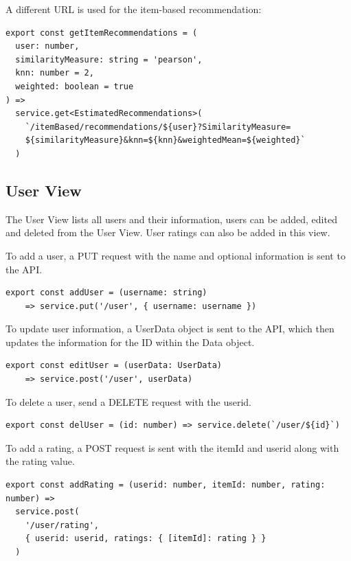 A different URL is used for the item-based recommendation:

\begin{verbatim}
export const getItemRecommendations = (
  user: number,
  similarityMeasure: string = 'pearson',
  knn: number = 2,
  weighted: boolean = true
) =>
  service.get<EstimatedRecommendations>(
    `/itemBased/recommendations/${user}?SimilarityMeasure=
    ${similarityMeasure}&knn=${knn}&weightedMean=${weighted}`
  )
\end{verbatim}

\subsection{User View}

The User View lists all users and their information, users can be added, edited and deleted from the User View. User ratings can also be added in this view.

To add a user, a PUT request with the name and optional information is sent to the API.
\begin{verbatim}
export const addUser = (username: string) 
    => service.put('/user', { username: username })
\end{verbatim}

To update user information, a UserData object is sent to the API, which then updates the information for the ID within the Data object.

\begin{verbatim}
export const editUser = (userData: UserData) 
    => service.post('/user', userData)
\end{verbatim}

To delete a user, send a DELETE request with the userid.

\begin{verbatim}
export const delUser = (id: number) => service.delete(`/user/${id}`)
\end{verbatim}

To add a rating, a POST request is sent with the itemId and userid along with the rating value.

\begin{verbatim}
export const addRating = (userid: number, itemId: number, rating: number) =>
  service.post(
    '/user/rating', 
    { userid: userid, ratings: { [itemId]: rating } }
  )
\end{verbatim}

